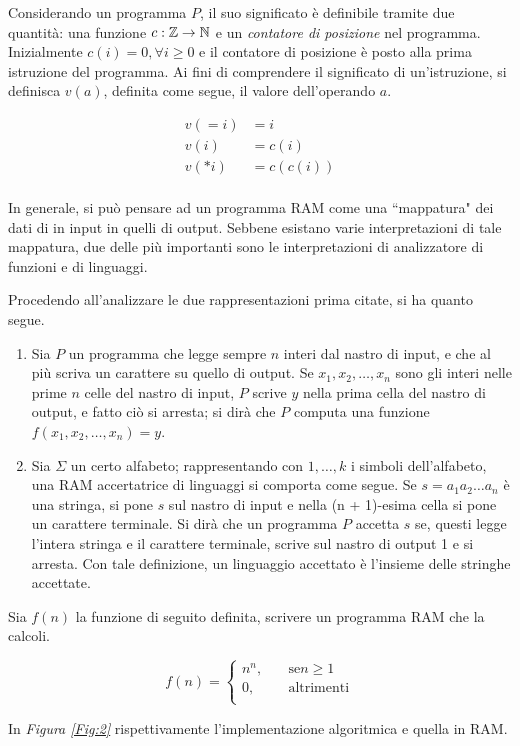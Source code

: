 \documentclass{subfiles}
\begin{document}
\noindent Considerando un programma \(P\), il suo significato è definibile tramite due quantità: una funzione \(c : \mathbb{Z} \to \mathbb{N}\) e un \emph{contatore di posizione} nel programma. \\
Inizialmente \(c(i) = 0, \forall i \ge 0\) e il contatore di posizione è posto alla prima istruzione del programma.
Ai fini di comprendere il significato di un'istruzione, si definisca \(v(a)\), definita come segue, il valore dell'operando \(a\).

\[\begin{aligned}
        v(=i) & = i       \\
        v(i)  & = c(i)    \\
        v(*i) & = c(c(i)) \\
    \end{aligned}\]

\noindent In generale, si può pensare ad un programma RAM come una ``mappatura" dei dati di in input in quelli di output.
Sebbene esistano varie interpretazioni di tale mappatura, due delle più importanti sono le interpretazioni di analizzatore di funzioni e di linguaggi.
\clearpage

\noindent Procedendo all'analizzare le due rappresentazioni prima citate, si ha quanto segue.
\begin{enumerate}
    \item Sia \(P\) un programma che legge sempre \(n\) interi dal nastro di input, e che al più scriva un carattere su quello di output.
          Se \(x_{1}, x_{2}, \ldots, x_{n}\) sono gli interi nelle prime \(n\) celle del nastro di input, \(P\) scrive \(y\) nella prima cella del nastro di output, e fatto ciò si arresta;
          si dirà che \(P\) computa una funzione \(f(x_{1}, x_{2}, \ldots, x_{n}) = y\).

    \item Sia \(\Sigma\) un certo alfabeto; rappresentando con \(1, \ldots, k\) i simboli dell'alfabeto, una RAM accertatrice di linguaggi si comporta come segue.
          Se \(s = a_{1} a_{2} \ldots a_{n}\) è una stringa, si pone \(s\) sul nastro di input e nella (n + 1)-esima cella si pone un carattere terminale.
          Si dirà che un programma \(P\) accetta \(s\) se, questi legge l'intera stringa e il carattere terminale, scrive sul nastro di output 1 e si arresta.
          Con tale definizione, un linguaggio accettato è l'insieme delle stringhe accettate.
\end{enumerate}

\begin{Example*}
    Sia \(f(n)\) la funzione di seguito definita, scrivere un programma RAM che la calcoli.

    \[f(n) = \begin{cases}
            n^{n}, \quad & \text{se} n \ge 1 \\
            0, \quad     & \text{altrimenti} \\
        \end{cases}\]

    \noindent In \emph{Figura \ref{Fig:2}} rispettivamente l'implementazione algoritmica e quella in RAM.
    

\end{Example*}
\end{document}
